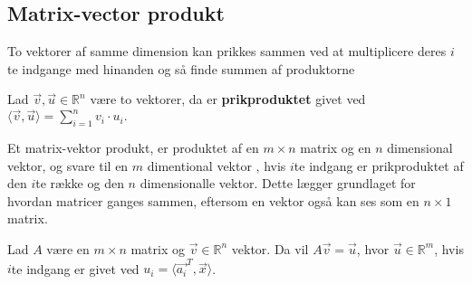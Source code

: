 \subsection{Matrix-vector produkt}
To vektorer af samme dimension kan prikkes sammen ved at multiplicere deres $i$te indgange med hinanden og så finde summen af produktorne
\begin{defn}[Prikproduktet]
Lad $\vec{v}, \vec{u} \in \mathds{R}^n$ være to vektorer, da er \textbf{prikproduktet} givet ved $\langle\vec{v},\vec{u}\rangle = \sum_{i=1}^n v_i \cdot u_i.$
\end{defn}
Et matrix-vektor produkt, er produktet af en $m\times n$ matrix og en $n$ dimensional vektor, og svare til en $m$ dimentional vektor , hvis $i$te indgang er prikproduktet af den $i$te række og den $n$ dimensionalle vektor. 
Dette lægger grundlaget for hvordan matricer ganges sammen, eftersom en vektor også kan ses som en $n\times1$ matrix. 
\begin{defn}
Lad $A$ være en $m\times n$ matrix og $\vec{v}\in \mathds{R}^n$ vektor. 
Da vil $A \vec{v} = \vec{u}$, hvor $\vec{u} \in \mathds{R}^m$, hvis $i$te indgang er givet ved $u_i = \langle \vec{a_i}^T, \vec{x}\rangle$.
\label{def:matrixvektorprodukt}
\end{defn}
